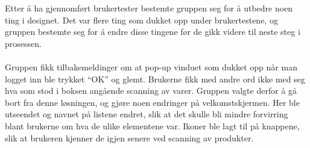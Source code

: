 Etter å ha gjennomført brukertester bestemte gruppen seg for å utbedre noen ting i designet. Det var flere ting som dukket opp under brukertestene, og gruppen bestemte seg for å endre disse tingene før de gikk videre til neste steg i prosessen.
\\\\
Gruppen fikk tilbakemeldinger om at pop-up vinduet som dukket opp når man logget inn ble trykket “OK” og glemt. Brukerne fikk med andre ord ikke med seg hva som stod i boksen angående scanning av varer. Gruppen valgte derfor å gå bort fra denne løsningen, og gjøre noen endringer på velkomstskjermen. Her ble utseendet og navnet på listene endret, slik at det skulle bli mindre forvirring blant brukerne om hva de ulike elementene var. Ikoner ble lagt til på knappene, slik at brukeren kjenner de igjen senere ved scanning av produkter. 

